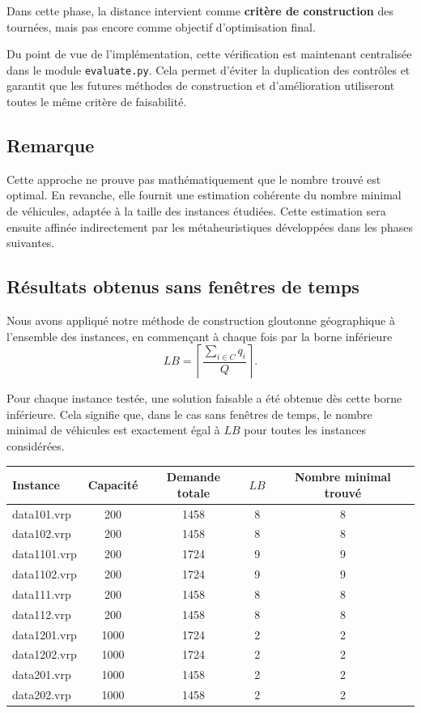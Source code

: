 \documentclass[11pt,a4paper]{article}
\begin{document}
Dans cette phase, la distance intervient comme \textbf{critère de construction} des tournées, mais pas encore comme objectif d'optimisation final.

Du point de vue de l'implémentation, cette vérification est maintenant centralisée dans le module \texttt{evaluate.py}. Cela permet d'éviter la duplication des contrôles et garantit que les futures méthodes de construction et d'amélioration utiliseront toutes le même critère de faisabilité.

\subsection{Remarque}
Cette approche ne prouve pas mathématiquement que le nombre trouvé est optimal. En revanche, elle fournit une estimation cohérente du nombre minimal de véhicules, adaptée à la taille des instances étudiées. Cette estimation sera ensuite affinée indirectement par les métaheuristiques développées dans les phases suivantes.

\subsection{Résultats obtenus sans fenêtres de temps}
Nous avons appliqué notre méthode de construction gloutonne géographique à l'ensemble des instances, en commençant à chaque fois par la borne inférieure
\[
LB = \left\lceil \frac{\sum_{i \in C} q_i}{Q} \right\rceil.
\]

Pour chaque instance testée, une solution faisable a été obtenue dès cette borne inférieure. Cela signifie que, dans le cas sans fenêtres de temps, le nombre minimal de véhicules est exactement égal à \(LB\) pour toutes les instances considérées.

\begin{center}
\begin{tabular}{lcccc}
\toprule
Instance & Capacité & Demande totale & \(LB\) & Nombre minimal trouvé \\
\midrule
data101.vrp  & 200  & 1458 & 8 & 8 \\
data102.vrp  & 200  & 1458 & 8 & 8 \\
data1101.vrp & 200  & 1724 & 9 & 9 \\
data1102.vrp & 200  & 1724 & 9 & 9 \\
data111.vrp  & 200  & 1458 & 8 & 8 \\
data112.vrp  & 200  & 1458 & 8 & 8 \\
data1201.vrp & 1000 & 1724 & 2 & 2 \\
data1202.vrp & 1000 & 1724 & 2 & 2 \\
data201.vrp  & 1000 & 1458 & 2 & 2 \\
data202.vrp  & 1000 & 1458 & 2 & 2 \\
\bottomrule
\end{tabular}
\end{center}
\end{document}

